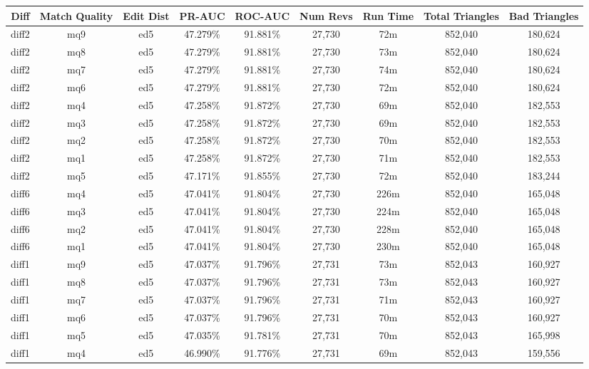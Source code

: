 \begin{sidewaystable}[!ph]
  \begin{center}
    \begin{tabular}{|c|c|c||c|c||c|c|c|c|}
\hline
Diff & Match Quality & Edit Dist
        & PR-AUC & ROC-AUC
        & Num Revs & Run Time
        & Total Triangles & Bad Triangles \\
\hline
\hline
diff2 & mq9 & ed5 & 47.279\% & 91.881\% & 27,730 & 72m & 852,040 & 180,624 \\
diff2 & mq8 & ed5 & 47.279\% & 91.881\% & 27,730 & 73m & 852,040 & 180,624 \\
diff2 & mq7 & ed5 & 47.279\% & 91.881\% & 27,730 & 74m & 852,040 & 180,624 \\
diff2 & mq6 & ed5 & 47.279\% & 91.881\% & 27,730 & 72m & 852,040 & 180,624 \\
diff2 & mq4 & ed5 & 47.258\% & 91.872\% & 27,730 & 69m & 852,040 & 182,553 \\
diff2 & mq3 & ed5 & 47.258\% & 91.872\% & 27,730 & 69m & 852,040 & 182,553 \\
diff2 & mq2 & ed5 & 47.258\% & 91.872\% & 27,730 & 70m & 852,040 & 182,553 \\
diff2 & mq1 & ed5 & 47.258\% & 91.872\% & 27,730 & 71m & 852,040 & 182,553 \\
diff2 & mq5 & ed5 & 47.171\% & 91.855\% & 27,730 & 72m & 852,040 & 183,244 \\
diff6 & mq4 & ed5 & 47.041\% & 91.804\% & 27,730 & 226m & 852,040 & 165,048 \\
diff6 & mq3 & ed5 & 47.041\% & 91.804\% & 27,730 & 224m & 852,040 & 165,048 \\
diff6 & mq2 & ed5 & 47.041\% & 91.804\% & 27,730 & 228m & 852,040 & 165,048 \\
diff6 & mq1 & ed5 & 47.041\% & 91.804\% & 27,730 & 230m & 852,040 & 165,048 \\
diff1 & mq9 & ed5 & 47.037\% & 91.796\% & 27,731 & 73m & 852,043 & 160,927 \\
diff1 & mq8 & ed5 & 47.037\% & 91.796\% & 27,731 & 73m & 852,043 & 160,927 \\
diff1 & mq7 & ed5 & 47.037\% & 91.796\% & 27,731 & 71m & 852,043 & 160,927 \\
diff1 & mq6 & ed5 & 47.037\% & 91.796\% & 27,731 & 70m & 852,043 & 160,927 \\
diff1 & mq5 & ed5 & 47.035\% & 91.781\% & 27,731 & 70m & 852,043 & 165,998 \\
diff1 & mq4 & ed5 & 46.990\% & 91.776\% & 27,731 & 69m & 852,043 & 159,556 \\

\end{tabular}
\end{center}
\end{sidewaystable}
